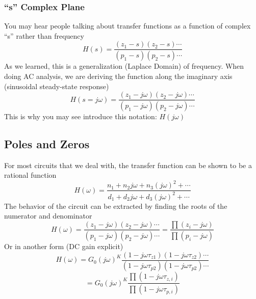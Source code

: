 \subsubsection{“s” Complex Plane}
You may hear people talking about transfer functions as a function of complex “s” rather than frequency
\begin{equation}
	H(s) = \frac{{({z_1} - s)({z_2} - s) \cdots }}{{({p_1} - s)({p_2} - s) \cdots }}
\end{equation}
As we learned, this is a generalization (Laplace Domain) of frequency. When doing AC analysis, we are deriving the function along the imaginary axis (sinusoidal steady-state response)
\begin{equation}
	H(s = j\omega ) = \frac{{({z_1} - j\omega )({z_2} - j\omega ) \cdots }}{{({p_1} - j\omega )({p_2} - j\omega ) \cdots }}
\end{equation}
This is why you may see introduce this notation:  $H(j\omega )$
\subsection{Poles and Zeros}
For most circuits that we deal with, the transfer function can be shown to be a rational function
\begin{equation}
	H(\omega ) = \frac{{{n_1} + {n_2}j\omega  + {n_3}{{(j\omega )}^2} +  \cdots }}{{{d_1} + {d_2}j\omega  + {d_3}{{(j\omega )}^2} +  \cdots }}
\end{equation}
The behavior of the circuit can be extracted by finding the roots of the numerator and denominator
\begin{equation} 
	H(\omega ) = \frac{{({z_1} - j\omega )({z_2} - j\omega ) \cdots }}{{({p_1} - j\omega )({p_2} - j\omega ) \cdots }} = \frac{{\prod {({z_i} - j\omega )} }}{{\prod {({p_i} - j\omega )} }}
\end{equation}
Or in another form (DC gain explicit)
\begin{equation}
	H(\omega ) = {G_0}{(j\omega )^K}\frac{{(1 - j\omega {\tau _{z1}})(1 - j\omega {\tau _{z2}}) \cdots }}{{(1 - j\omega {\tau _{p2}})(1 - j\omega {\tau _{p2}}) \cdots }}
\end{equation}	
\begin{equation} = {G_0}{(j\omega )^K}\frac{{\prod {(1 - j\omega {\tau _{z,i}})} }}{{\prod {(1 - j\omega {\tau _{p,i}})} }}
\end{equation}
